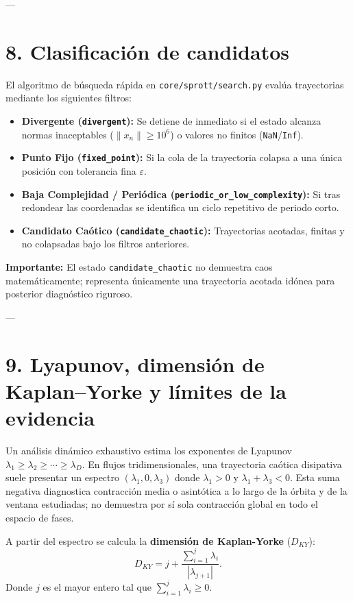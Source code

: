 \documentclass[11pt]{article}
\newcommand{\code}[1]{\texttt{#1}}
\begin{document}
---

\section{8. Clasificación de candidatos}

El algoritmo de búsqueda rápida en \code{core/sprott/search.py} evalúa trayectorias mediante los siguientes filtros:
\begin{itemize}
  \item \textbf{Divergente (\code{divergent}):} Se detiene de inmediato si el estado alcanza normas inaceptables ($\|x_n\| \geq 10^6$) o valores no finitos (\code{NaN}/\code{Inf}).
  \item \textbf{Punto Fijo (\code{fixed\_point}):} Si la cola de la trayectoria colapsa a una única posición con tolerancia fina $\varepsilon$.
  \item \textbf{Baja Complejidad / Periódica (\code{periodic\_or\_low\_complexity}):} Si tras redondear las coordenadas se identifica un ciclo repetitivo de periodo corto.
  \item \textbf{Candidato Caótico (\code{candidate\_chaotic}):} Trayectorias acotadas, finitas y no colapsadas bajo los filtros anteriores.
\end{itemize}
\textbf{Importante:} El estado \code{candidate\_chaotic} no demuestra caos matemáticamente; representa únicamente una trayectoria acotada idónea para posterior diagnóstico riguroso.

---

\section{9. Lyapunov, dimensión de Kaplan--Yorke y límites de la evidencia}

Un análisis dinámico exhaustivo estima los exponentes de Lyapunov $\lambda_1 \geq \lambda_2 \geq \cdots \geq \lambda_D$. En flujos tridimensionales, una trayectoria caótica disipativa suele presentar un espectro $(\lambda_1, 0, \lambda_3)$ donde $\lambda_1 > 0$ y $\lambda_1 + \lambda_3 < 0$. Esta suma negativa diagnostica contracción media o asintótica a lo largo de la órbita y de la ventana estudiadas; no demuestra por sí sola contracción global en todo el espacio de fases.

A partir del espectro se calcula la \textbf{dimensión de Kaplan-Yorke} ($D_{KY}$):
\[
D_{KY} = j + \frac{\sum_{i=1}^{j} \lambda_i}{|\lambda_{j+1}|}.
\]
Donde $j$ es el mayor entero tal que $\sum_{i=1}^j \lambda_i \geq 0$.
\end{document}
